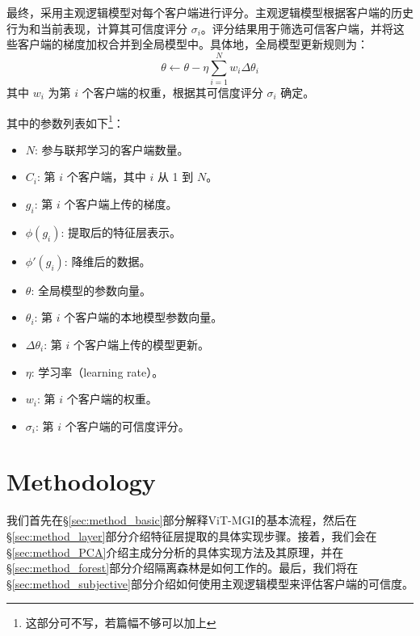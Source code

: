 \documentclass[conference]{IEEEtran}
\begin{document}
最终，采用主观逻辑模型对每个客户端进行评分。主观逻辑模型根据客户端的历史行为和当前表现，计算其可信度评分 $\sigma_i$。评分结果用于筛选可信客户端，并将这些客户端的梯度加权合并到全局模型中。具体地，全局模型更新规则为：
\[
\theta \leftarrow \theta - \eta \sum_{i=1}^N w_i \Delta \theta_i
\]
其中 $w_i$ 为第 $i$ 个客户端的权重，根据其可信度评分 $\sigma_i$ 确定。

其中的参数列表如下\footnote{这部分可不写，若篇幅不够可以加上}：

\begin{itemize}
    \item $N$: 参与联邦学习的客户端数量。
    \item $C_i$: 第 $i$ 个客户端，其中 $i$ 从 1 到 $N$。
    \item $g_i$: 第 $i$ 个客户端上传的梯度。
    \item $\phi(g_i)$: 提取后的特征层表示。
    \item $\phi'(g_i)$: 降维后的数据。
    \item $\theta$: 全局模型的参数向量。
    \item $\theta_i$: 第 $i$ 个客户端的本地模型参数向量。
    \item $\Delta \theta_i$: 第 $i$ 个客户端上传的模型更新。
    \item $\eta$: 学习率（learning rate）。
    \item $w_i$: 第 $i$ 个客户端的权重。
    \item $\sigma_i$: 第 $i$ 个客户端的可信度评分。
\end{itemize}









\section{Methodology}
\label{sec:method}

我们首先在\hyperref[sec:method_basic]{§\ref{sec:method_basic}}部分解释ViT-MGI的基本流程，然后在\hyperref[sec:method_layer]{§\ref{sec:method_layer}}部分介绍特征层提取的具体实现步骤。接着，我们会在\hyperref[sec:method_PCA]{§\ref{sec:method_PCA}}介绍主成分分析的具体实现方法及其原理，并在\hyperref[sec:method_forest]{§\ref{sec:method_forest}}部分介绍隔离森林是如何工作的。最后，我们将在\hyperref[sec:method_subjective]{§\ref{sec:method_subjective}}部分介绍如何使用主观逻辑模型来评估客户端的可信度。
\end{document}
